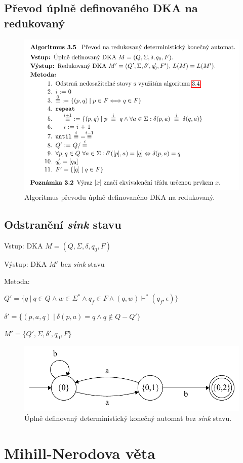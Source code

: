 \subsection{Převod úplně definovaného DKA na redukovaný}

\begin{figure}[H]
    \centering
    \includegraphics[width=0.9\linewidth]{prevod_na_redukovany_dka.pdf}
    \caption{Algoritmus převodu úplně definovaného DKA na redukovaný.}
\end{figure}

\subsection{Odstranění \textit{sink} stavu}

\begin{compactitem}
    \item Vstup: DKA $M = (Q, \Sigma, \delta, q_0, F)$
    \item Výstup: DKA $M'$ bez \textit{sink} stavu
    \item Metoda: \begin{compactenum}
        \item $Q' = \{ q ~|~ q \in Q \land w \in \Sigma^* \land q_f \in F \land (q, w) \vdash^* (q_f, \epsilon) \}$
        \item $\delta' = \{ (p, a, q) ~|~ \delta(p, a) = q \land q \not\in Q - Q' \}$
        \item $M' = \{ Q', \Sigma, \delta', q_0, F \}$
    \end{compactenum}
\end{compactitem}

\begin{figure}[H]
    \centering
    \includegraphics[width=0.75\linewidth]{dka.pdf}
    \caption{Úplně definovaný deterministický konečný automat bez \textit{sink} stavu.}
\end{figure}


\section{Mihill-Nerodova věta}

